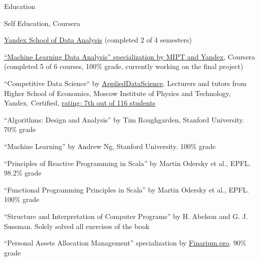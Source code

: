 \documentclass{resume} %
\begin{document}
\begin{rSection}{Education}

\begin{rSubsectionSchools}{Self Education, Coursera}
\item \href{https://yandexdataschool.com/}{Yandex School of Data Analysis} (completed 2 of 4 semesters)
\item \href{https://www.coursera.org/specializations/machine-learning-data-analysis}
{``Machine Learning Data Analysis'' specialization by MIPT and Yandex}, Coursera (completed 5 of 6 courses, 100\% grade, currently working on the final project)
\item ``Competitive Data Science`` by \href{https://www.facebook.com/groups/data.mining.in.action/}{AppliedDataScience}.
Lecturers and tutors from Higher School of Economics, Moscow Institute of Physics and Technology,
Yandex. Certified, \href{https://docs.google.com/spreadsheets/d/1jFqmeIUA7gnFFApWf7_YrefQ2XT8TcSl2M_t68gpIOY/edit#gid=511559587}{rating: 7th out of 116 students}
\item ``Algorithms: Design and Analysis'' by Tim Roughgarden, Stanford University. 70\% grade
\item ``Machine Learning'' by Andrew Ng, Stanford University. 100\% grade
\item ``Principles of Reactive Programming in Scala'' by Martin Odersky et al., EPFL. 98.2\% grade
\item ``Functional Programming Principles in Scala'' by Martin Odersky et al., EPFL. 100\% grade
\item ``Structure and Interpretation of Computer Programs'' by H. Abelson and G. J. Sussman.
Solely solved all exercises of the book
\item ``Personal Assets Allocation Management'' specialization by
      \href{https://finarium.pro/}{Finarium.pro}. 90\% grade
\end{rSubsectionSchools}
\end{rSection}

\end{document}
